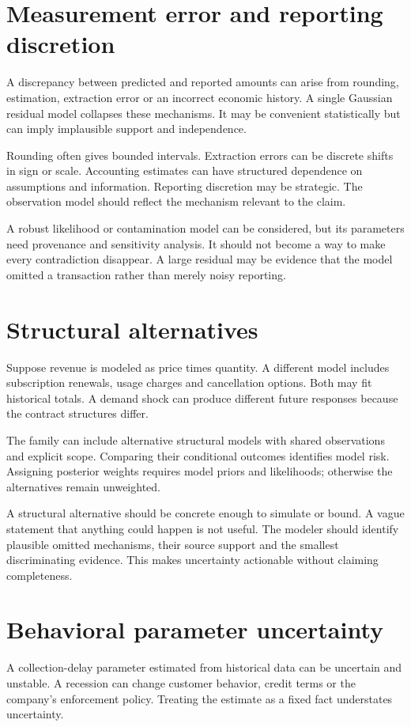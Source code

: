 \section{Measurement error and reporting discretion}
A discrepancy between predicted and reported amounts can arise from rounding, estimation, extraction error or an incorrect economic history. A single Gaussian residual model collapses these mechanisms. It may be convenient statistically but can imply implausible support and independence.

Rounding often gives bounded intervals. Extraction errors can be discrete shifts in sign or scale. Accounting estimates can have structured dependence on assumptions and information. Reporting discretion may be strategic. The observation model should reflect the mechanism relevant to the claim.

A robust likelihood or contamination model can be considered, but its parameters need provenance and sensitivity analysis. It should not become a way to make every contradiction disappear. A large residual may be evidence that the model omitted a transaction rather than merely noisy reporting.

\section{Structural alternatives}
Suppose revenue is modeled as price times quantity. A different model includes subscription renewals, usage charges and cancellation options. Both may fit historical totals. A demand shock can produce different future responses because the contract structures differ.

The family can include alternative structural models with shared observations and explicit scope. Comparing their conditional outcomes identifies model risk. Assigning posterior weights requires model priors and likelihoods; otherwise the alternatives remain unweighted.

A structural alternative should be concrete enough to simulate or bound. A vague statement that anything could happen is not useful. The modeler should identify plausible omitted mechanisms, their source support and the smallest discriminating evidence. This makes uncertainty actionable without claiming completeness.

\section{Behavioral parameter uncertainty}
A collection-delay parameter estimated from historical data can be uncertain and unstable. A recession can change customer behavior, credit terms or the company's enforcement policy. Treating the estimate as a fixed fact understates uncertainty.


